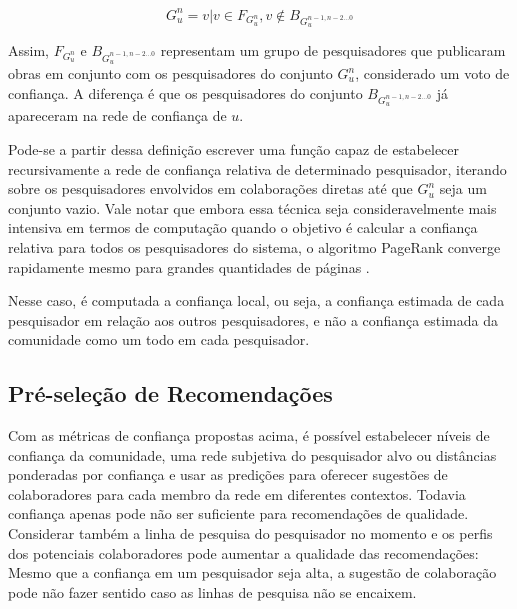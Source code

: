 \documentclass[12pt]{article}
\begin{document}
\begin{equation} \label{eqn:subjective-network}
 G_{u}^{n} = v | v \in F_{G_{u}^{n}}, v \notin B_{G_{u}^{n-1, n-2 \dots 0}}
\end{equation}

Assim, $F_{G_{u}^{n}}$ e $B_{G_{u}^{n-1, n-2 \dots 0}}$ representam um grupo de pesquisadores que publicaram obras em conjunto 
com os pesquisadores do conjunto $G_{u}^{n}$, considerado um voto de  confiança. A diferença é que os pesquisadores do conjunto 
$B_{G_u^{n-1, n-2 \dots 0}}$ já apareceram na rede de confiança de $u$.

Pode-se a partir dessa definição escrever uma função capaz de estabelecer recursivamente a rede de confiança relativa de 
determinado pesquisador, iterando sobre os pesquisadores envolvidos  em colaborações diretas até que $ G^{n}_{u} $ seja um 
conjunto vazio. Vale notar que embora essa técnica seja consideravelmente mais intensiva em termos de computação quando o objetivo 
é calcular a confiança relativa para todos os pesquisadores do sistema, o algoritmo PageRank converge rapidamente mesmo para 
grandes quantidades de páginas \cite{page1999pagerank}.

Nesse caso, é computada a confiança local, ou seja, a confiança estimada de cada pesquisador em relação aos outros pesquisadores, 
e não a confiança estimada da comunidade como um todo em cada pesquisador.

\subsection{Pré-seleção de Recomendações} \label{sect:pre-selection}

Com as métricas de confiança propostas acima, é possível estabelecer níveis de confiança da comunidade, uma rede subjetiva do 
pesquisador alvo ou distâncias ponderadas por confiança e usar as predições para oferecer sugestões de colaboradores para cada 
membro da rede em diferentes contextos. Todavia confiança apenas pode não ser suficiente para recomendações de qualidade. 
Considerar também a linha de pesquisa do pesquisador no momento e os perfis dos potenciais colaboradores pode aumentar a qualidade 
das recomendações: Mesmo que a confiança em um pesquisador seja alta, a sugestão de colaboração pode não fazer sentido caso as 
linhas de pesquisa não se encaixem.
\end{document}
